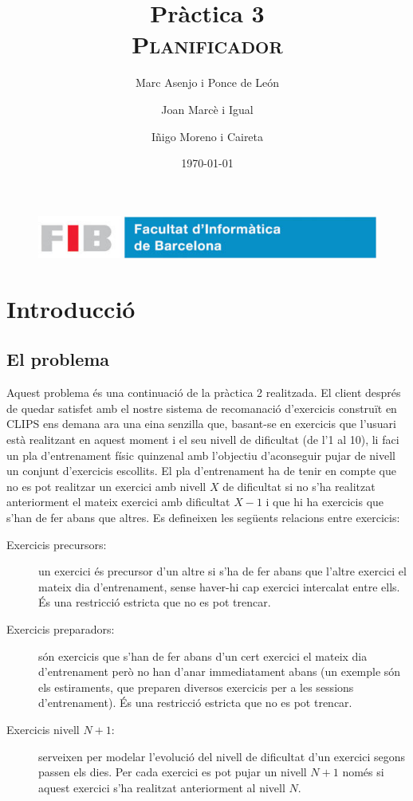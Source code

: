 \documentclass[a4paper,12pt, UTF-8]{article}
\title{
	\Huge
	\textbf{Pràctica 3} \\ 
	\scshape Planificador
}
\author{
	Marc Asenjo i Ponce de León \and
	Joan Marcè i Igual \and
	Iñigo Moreno i Caireta
}
\date{\today}
\begin{document}
\maketitle

\begin{figure}
	\centering
	\includegraphics[width=0.8\linewidth]{./simple_FIB}
\end{figure}

\newpage

\section{Introducció}

\subsection{El problema}

Aquest problema és una continuació de la pràctica 2 realitzada. El client després de quedar satisfet amb el nostre sistema de recomanació d'exercicis construït en CLIPS ens demana ara una eina senzilla que, basant-se en exercicis que l'usuari està realitzant en aquest moment i el seu nivell de dificultat (de l'1 al 10), li faci un pla d'entrenament físic quinzenal amb l'objectiu d'aconseguir pujar de nivell un conjunt d'exercicis escollits. El pla d'entrenament ha de tenir en compte que no es pot realitzar un exercici amb nivell $X$ de dificultat si no s'ha realitzat anteriorment el mateix exercici amb dificultat $X - 1$ i que hi ha exercicis que s'han de fer abans que altres. Es defineixen les següents relacions entre exercicis:

\begin{description}
	\item[Exercicis precursors:] un exercici és precursor d'un altre si s'ha de fer abans que l'altre exercici el mateix dia d'entrenament, sense haver-hi cap exercici intercalat entre ells. És una restricció estricta que no es pot trencar.
	\item[Exercicis preparadors:] són exercicis que s'han de fer abans d'un cert exercici el mateix dia d'entrenament però no han d'anar immediatament abans (un exemple són els estiraments, que preparen diversos exercicis per a les sessions d'entrenament). És una restricció estricta que no es pot trencar.
	\item[Exercicis nivell $N + 1$:] serveixen per modelar l'evolució del nivell de dificultat d'un exercici segons passen els dies. Per cada exercici es pot pujar un nivell $N + 1$ només si aquest exercici s'ha realitzat anteriorment al nivell $N$.
\end{description}
\end{document}
